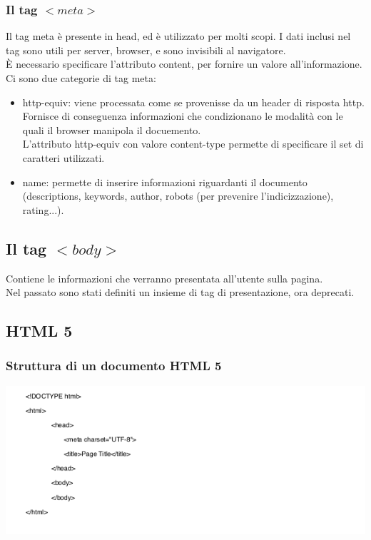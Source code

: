 \documentclass{article}
\begin{document}
\subsubsection{Il tag $<meta>$}
Il tag meta è presente in head, ed è utilizzato per molti scopi. I dati inclusi nel tag sono utili per server, browser, e sono invisibili al navigatore.\\
È necessario specificare l'attributo content, per fornire un valore all'informazione.
Ci sono due categorie di tag meta:
\begin{itemize}
	\item http-equiv: viene processata come se provenisse da un header di risposta http. Fornisce di conseguenza informazioni che condizionano le modalità con le quali il browser manipola il docuemento.\\
	L'attributo http-equiv con valore content-type permette di specificare il set di caratteri utilizzati.
	\item name: permette di inserire informazioni riguardanti il documento (descriptions, keywords, author, robots (per prevenire l'indicizzazione), rating...).
\end{itemize}
\subsection{Il tag $<body>$}
Contiene le informazioni che verranno presentata all'utente sulla pagina.\\
Nel passato sono stati definiti un insieme di tag di presentazione, ora deprecati.
\subsection{HTML 5}
\subsubsection{Struttura di un documento HTML 5}
\includegraphics{structhtml5}\\
\end{document}
